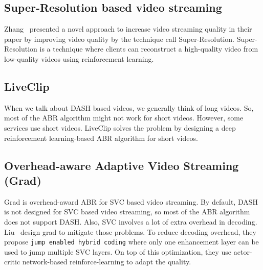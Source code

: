 \subsection{Super-Resolution based video streaming}
Zhang \etal\ presented a novel approach to increase video streaming quality in their paper \cite{9155384} by improving video quality by the technique call Super-Resolution. Super-Resolution is a technique where clients can reconstruct a high-quality video from low-quality videos using reinforcement learning.

\subsection{LiveClip}
When we talk about DASH based videos, we generally think of long videos. So, most of the ABR algorithm might not work for short videos. However, some services use short videos. LiveClip\cite{10.1145/3386290.3396937} solves the problem by designing a deep reinforcement learning-based ABR algorithm for short videos.

\subsection{Overhead-aware Adaptive Video Streaming (Grad)}
Grad\cite{10.1145/3394171.3413512} is overhead-award ABR for SVC based video streaming. By default, DASH is not designed for SVC based video streaming, so most of the ABR algorithm does not support DASH. Also, SVC involves a lot of extra overhead in decoding. Liu \etal\ design grad to mitigate those problems. To reduce decoding overhead, they propose {\tt jump enabled hybrid coding} where only one enhancement layer can be used to jump multiple SVC layers. On top of this optimization, they use actor-critic network-based reinforce-learning to adapt the quality.

